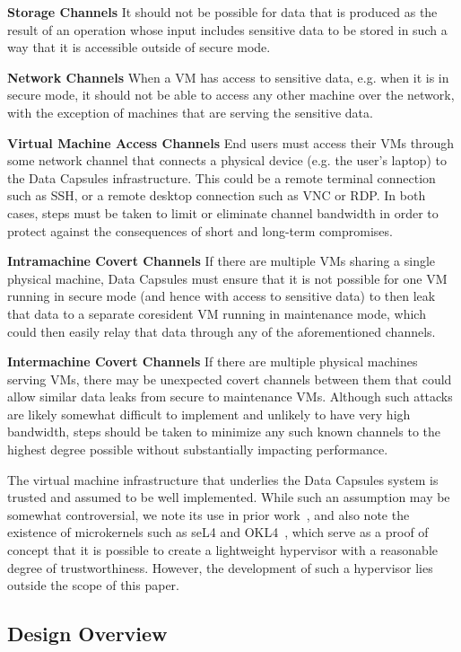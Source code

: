 \documentclass{acm_proc_article-sp}
\begin{document}
\textbf{Storage Channels} It should not be possible for data that is produced
as the result of an operation whose input includes sensitive data to be stored
in such a way that it is accessible outside of secure mode.

\textbf{Network Channels} When a VM has access to sensitive data, e.g. when it
is in secure mode, it should not be able to access any other machine over the
network, with the exception of machines that are serving the sensitive data.

\textbf{Virtual Machine Access Channels} End users must access their VMs
through some network channel that connects a physical device (e.g. the user's
laptop) to the Data Capsules infrastructure.  This could be a remote terminal
connection such as SSH, or a remote desktop connection such as VNC or RDP.  In
both cases, steps must be taken to limit or eliminate channel bandwidth in order
to protect against the consequences of short and long-term compromises.

\textbf{Intramachine Covert Channels} If there are multiple VMs sharing a
single physical machine, Data Capsules must ensure that it is not possible for
one VM running in secure mode (and hence with access to sensitive data) to then
leak that data to a separate coresident VM running in maintenance mode, which
could then easily relay that data through any of the aforementioned channels.

\textbf{Intermachine Covert Channels} If there are multiple physical machines
serving VMs, there may be unexpected covert channels between them that could
allow similar data leaks from secure to maintenance VMs.  Although such attacks
are likely somewhat difficult to implement and unlikely to have very high
bandwidth, steps should be taken to minimize any such known channels to the
highest degree possible without substantially impacting performance.

The virtual machine infrastructure that underlies the Data Capsules system is
trusted and assumed to be well implemented.  While such an assumption may be
somewhat controversial, we note its use in prior work~\cite{capsules}, and also
note the existence of microkernels such as seL4 and OKL4~\cite{sel4, OKL4},
which serve as a proof of concept that it is possible to create a lightweight
hypervisor with a reasonable degree of trustworthiness.  However, the
development of such a hypervisor lies outside the scope of this paper.

\subsection{Design Overview}
\end{document}
